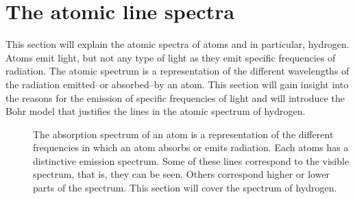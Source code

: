 \documentclass[main.tex]{subfiles}
\newcommand\chapterlabel{electrons}
\begin{document}
\section{The atomic line spectra}
This section will explain the atomic spectra of atoms and in particular, hydrogen. Atoms emit light, but not any type of light as they emit specific frequencies of radiation. The atomic spectrum is a representation of the different wavelengths of the radiation emitted--or absorbed--by an atom. This section will gain insight into the reasons for the emission of specific frequencies of light and will introduce the Bohr model that justifies the lines in the atomic spectrum of hydrogen.
\sloppy
\begin{description}
\item[]
The absorption spectrum of an atom is a representation of the different frequencies in which an atom absorbs or emits radiation. Each atoms has a distinctive emission spectrum. Some of these lines correspond to the visible spectrum, that is, they can be seen. Others correspond higher or lower parts of the spectrum. This section will cover the spectrum of hydrogen. 
     \label{Fig:{\chapterlabel}\thefigurenewcounter}
     \begin{center}\end{center}






\end{description}
\end{document}
